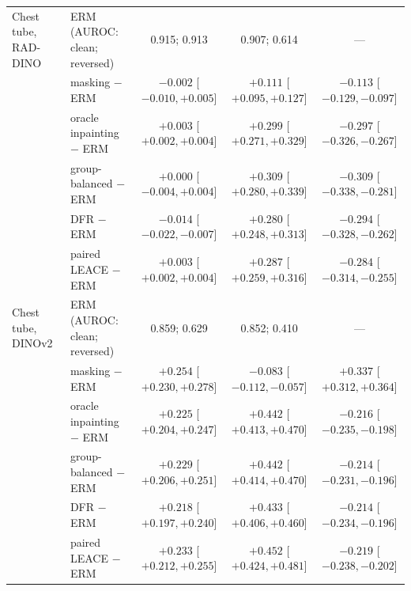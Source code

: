 {\begin{longtable}{p{2.6cm}p{3.2cm}ccc}
Chest tube, RAD-DINO & ERM (AUROC: clean; reversed) & 0.915; 0.913 & 0.907; 0.614 & --- \\
 & masking $-$ ERM & $-0.002$ [$-0.010, +0.005$] & $+0.111$ [$+0.095, +0.127$] & $-0.113$ [$-0.129, -0.097$] \\
 & oracle inpainting $-$ ERM & $+0.003$ [$+0.002, +0.004$] & $+0.299$ [$+0.271, +0.329$] & $-0.297$ [$-0.326, -0.267$] \\
 & group-balanced $-$ ERM & $+0.000$ [$-0.004, +0.004$] & $+0.309$ [$+0.280, +0.339$] & $-0.309$ [$-0.338, -0.281$] \\
 & DFR $-$ ERM & $-0.014$ [$-0.022, -0.007$] & $+0.280$ [$+0.248, +0.313$] & $-0.294$ [$-0.328, -0.262$] \\
 & paired LEACE $-$ ERM & $+0.003$ [$+0.002, +0.004$] & $+0.287$ [$+0.259, +0.316$] & $-0.284$ [$-0.314, -0.255$] \\
Chest tube, DINOv2 & ERM (AUROC: clean; reversed) & 0.859; 0.629 & 0.852; 0.410 & --- \\
 & masking $-$ ERM & $+0.254$ [$+0.230, +0.278$] & $-0.083$ [$-0.112, -0.057$] & $+0.337$ [$+0.312, +0.364$] \\
 & oracle inpainting $-$ ERM & $+0.225$ [$+0.204, +0.247$] & $+0.442$ [$+0.413, +0.470$] & $-0.216$ [$-0.235, -0.198$] \\
 & group-balanced $-$ ERM & $+0.229$ [$+0.206, +0.251$] & $+0.442$ [$+0.414, +0.470$] & $-0.214$ [$-0.231, -0.196$] \\
 & DFR $-$ ERM & $+0.218$ [$+0.197, +0.240$] & $+0.433$ [$+0.406, +0.460$] & $-0.214$ [$-0.234, -0.196$] \\
 & paired LEACE $-$ ERM & $+0.233$ [$+0.212, +0.255$] & $+0.452$ [$+0.424, +0.481$] & $-0.219$ [$-0.238, -0.202$] \\
\end{longtable}}
